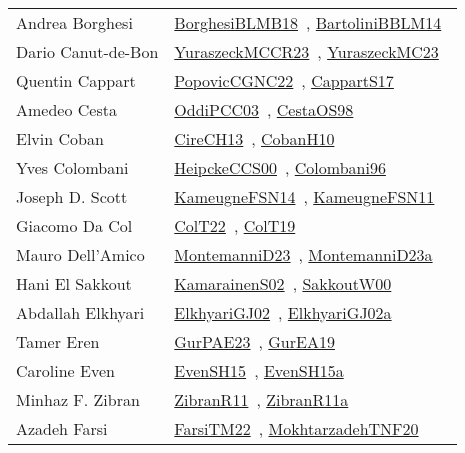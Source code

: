 {\begin{longtable}{p{4cm}p{20cm}}
Andrea Borghesi & \href{works/BorghesiBLMB18.pdf}{BorghesiBLMB18}~\cite{BorghesiBLMB18}, \href{works/BartoliniBBLM14.pdf}{BartoliniBBLM14}~\cite{BartoliniBBLM14}\\
Dario Canut{-}de{-}Bon & \href{works/YuraszeckMCCR23.pdf}{YuraszeckMCCR23}~\cite{YuraszeckMCCR23}, \href{works/YuraszeckMC23.pdf}{YuraszeckMC23}~\cite{YuraszeckMC23}\\
Quentin Cappart & \href{works/PopovicCGNC22.pdf}{PopovicCGNC22}~\cite{PopovicCGNC22}, \href{works/CappartS17.pdf}{CappartS17}~\cite{CappartS17}\\
Amedeo Cesta & \href{works/OddiPCC03.pdf}{OddiPCC03}~\cite{OddiPCC03}, \href{works/CestaOS98.pdf}{CestaOS98}~\cite{CestaOS98}\\
Elvin Coban & \href{works/CireCH13.pdf}{CireCH13}~\cite{CireCH13}, \href{works/CobanH10.pdf}{CobanH10}~\cite{CobanH10}\\
Yves Colombani & \href{works/HeipckeCCS00.pdf}{HeipckeCCS00}~\cite{HeipckeCCS00}, \href{works/Colombani96.pdf}{Colombani96}~\cite{Colombani96}\\
Joseph D. Scott & \href{works/KameugneFSN14.pdf}{KameugneFSN14}~\cite{KameugneFSN14}, \href{works/KameugneFSN11.pdf}{KameugneFSN11}~\cite{KameugneFSN11}\\
Giacomo Da Col & \href{works/ColT22.pdf}{ColT22}~\cite{ColT22}, \href{works/ColT19.pdf}{ColT19}~\cite{ColT19}\\
Mauro Dell'Amico & \href{works/MontemanniD23.pdf}{MontemanniD23}~\cite{MontemanniD23}, \href{works/MontemanniD23a.pdf}{MontemanniD23a}~\cite{MontemanniD23a}\\
Hani El Sakkout & \href{works/KamarainenS02.pdf}{KamarainenS02}~\cite{KamarainenS02}, \href{works/SakkoutW00.pdf}{SakkoutW00}~\cite{SakkoutW00}\\
Abdallah Elkhyari & \href{works/ElkhyariGJ02.pdf}{ElkhyariGJ02}~\cite{ElkhyariGJ02}, \href{works/ElkhyariGJ02a.pdf}{ElkhyariGJ02a}~\cite{ElkhyariGJ02a}\\
Tamer Eren & \href{works/GurPAE23.pdf}{GurPAE23}~\cite{GurPAE23}, \href{works/GurEA19.pdf}{GurEA19}~\cite{GurEA19}\\
Caroline Even & \href{works/EvenSH15.pdf}{EvenSH15}~\cite{EvenSH15}, \href{works/EvenSH15a.pdf}{EvenSH15a}~\cite{EvenSH15a}\\
Minhaz F. Zibran & \href{works/ZibranR11.pdf}{ZibranR11}~\cite{ZibranR11}, \href{works/ZibranR11a.pdf}{ZibranR11a}~\cite{ZibranR11a}\\
Azadeh Farsi & \href{}{FarsiTM22}~\cite{FarsiTM22}, \href{}{MokhtarzadehTNF20}~\cite{MokhtarzadehTNF20}\\

\end{longtable}}
